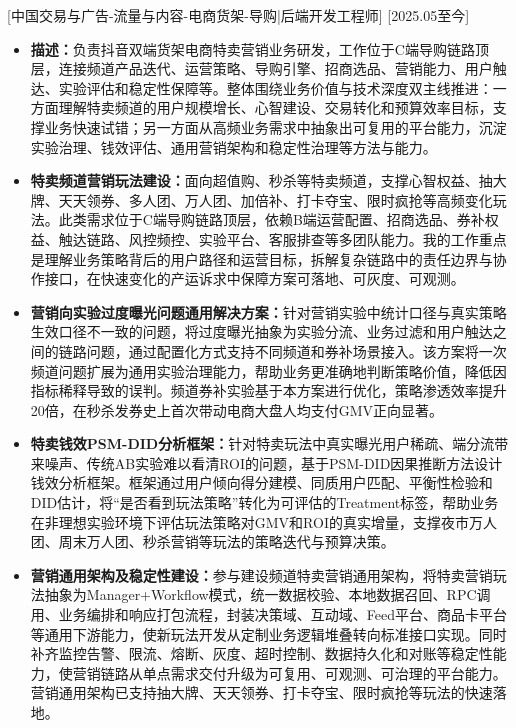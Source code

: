 \documentclass{style/template}
\begin{document}
[\textnormal{中国交易与广告-流量与内容-电商货架-导购|}后端开发工程师]
[2025.05至今]
\begin{itemize}
    \item \textbf{描述：}负责抖音双端货架电商特卖营销业务研发，工作位于C端导购链路顶层，连接频道产品迭代、运营策略、导购引擎、招商选品、营销能力、用户触达、实验评估和稳定性保障等。整体围绕业务价值与技术深度双主线推进：一方面理解特卖频道的用户规模增长、心智建设、交易转化和预算效率目标，支撑业务快速试错；另一方面从高频业务需求中抽象出可复用的平台能力，沉淀实验治理、钱效评估、通用营销架构和稳定性治理等方法与能力。
    \item \textbf{特卖频道营销玩法建设：}面向超值购、秒杀等特卖频道，支撑心智权益、抽大牌、天天领券、多人团、万人团、加倍补、打卡夺宝、限时疯抢等高频变化玩法。此类需求位于C端导购链路顶层，依赖B端运营配置、招商选品、券补权益、触达链路、风控频控、实验平台、客服排查等多团队能力。我的工作重点是理解业务策略背后的用户路径和运营目标，拆解复杂链路中的责任边界与协作接口，在快速变化的产运诉求中保障方案可落地、可灰度、可观测。
    \item \textbf{营销向实验过度曝光问题通用解决方案：}针对营销实验中统计口径与真实策略生效口径不一致的问题，将过度曝光抽象为实验分流、业务过滤和用户触达之间的链路问题，通过配置化方式支持不同频道和券补场景接入。该方案将一次频道问题扩展为通用实验治理能力，帮助业务更准确地判断策略价值，降低因指标稀释导致的误判。频道券补实验基于本方案进行优化，策略渗透效率提升20倍，在秒杀发券史上首次带动电商大盘人均支付GMV正向显著。
    \item \textbf{特卖钱效PSM-DID分析框架：}针对特卖玩法中真实曝光用户稀疏、端分流带来噪声、传统AB实验难以看清ROI的问题，基于PSM-DID因果推断方法设计钱效分析框架。框架通过用户倾向得分建模、同质用户匹配、平衡性检验和DID估计，将“是否看到玩法策略”转化为可评估的Treatment标签，帮助业务在非理想实验环境下评估玩法策略对GMV和ROI的真实增量，支撑夜市万人团、周末万人团、秒杀营销等玩法的策略迭代与预算决策。
    \item \textbf{营销通用架构及稳定性建设：}参与建设频道特卖营销通用架构，将特卖营销玩法抽象为Manager+Workflow模式，统一数据校验、本地数据召回、RPC调用、业务编排和响应打包流程，封装决策域、互动域、Feed平台、商品卡平台等通用下游能力，使新玩法开发从定制业务逻辑堆叠转向标准接口实现。同时补齐监控告警、限流、熔断、灰度、超时控制、数据持久化和对账等稳定性能力，使营销链路从单点需求交付升级为可复用、可观测、可治理的平台能力。营销通用架构已支持抽大牌、天天领券、打卡夺宝、限时疯抢等玩法的快速落地。
\end{itemize}
\end{document}
